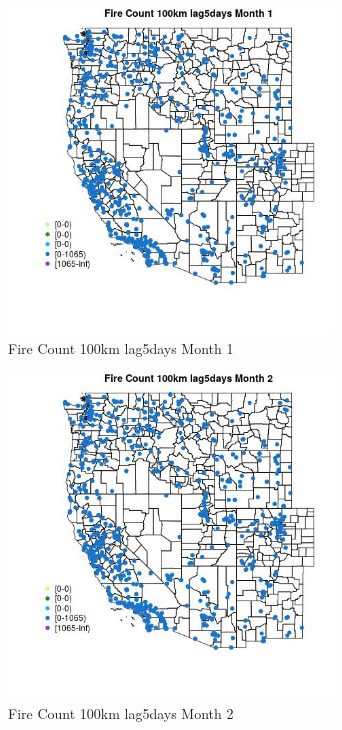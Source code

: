 \begin{figure} 
\centering  
\includegraphics[width=0.77\textwidth]{Code_Outputs/Report_ML_input_PM25_Step4_part_f_de_duplicated_aveswNAs_MapObsMo1Fire_Count_100km_lag5days.jpg} 
\caption{\label{fig:Report_ML_input_PM25_Step4_part_f_de_duplicated_aveswNAsMapObsMo1Fire_Count_100km_lag5days}Fire Count 100km lag5days Month 1} 
\end{figure} 
 

\begin{figure} 
\centering  
\includegraphics[width=0.77\textwidth]{Code_Outputs/Report_ML_input_PM25_Step4_part_f_de_duplicated_aveswNAs_MapObsMo2Fire_Count_100km_lag5days.jpg} 
\caption{\label{fig:Report_ML_input_PM25_Step4_part_f_de_duplicated_aveswNAsMapObsMo2Fire_Count_100km_lag5days}Fire Count 100km lag5days Month 2} 
\end{figure} 
 

